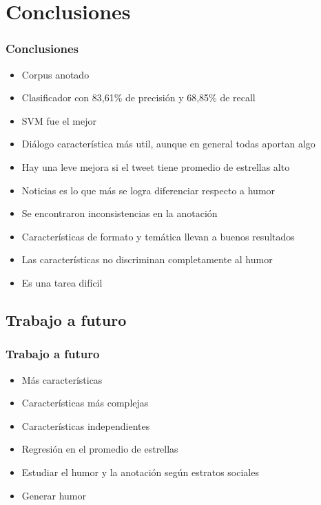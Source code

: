 \section{Conclusiones}

\begin{frame}
    \frametitle{Conclusiones}
    
    \begin{itemize}
    	\item[\checkmark] Corpus anotado
    	\item[\checkmark] Clasificador con 83,61\% de precisión y 68,85\% de recall
    	\item[\checkmark] SVM fue el mejor
    	\item[\checkmark] Diálogo característica más util, aunque en general todas aportan algo
    	\item[\checkmark] Hay una leve mejora si el tweet tiene promedio de estrellas alto
    	\item[\checkmark] Noticias es lo que más se logra diferenciar respecto a humor
    	\item[\checkmark] Se encontraron inconsistencias en la anotación
        \item[\checkmark] Características de formato y temática llevan a buenos resultados
    	\item[\checkmark] Las características no discriminan completamente al humor
    	\item[\checkmark] Es una tarea difícil
    \end{itemize}
\end{frame}

\subsection{Trabajo a futuro}
\begin{frame}
    \frametitle{Trabajo a futuro}
    
    \begin{itemize}
        \item Más características
    	\item Características más complejas
    	\item Características independientes
    	\item Regresión en el promedio de estrellas
    	\item Estudiar el humor y la anotación según estratos sociales
        \item Generar humor
    \end{itemize}
\end{frame}
